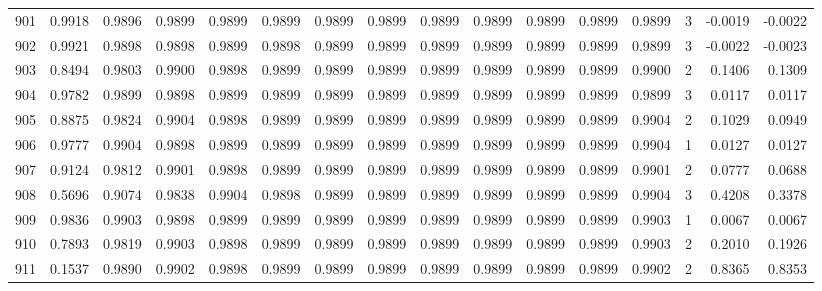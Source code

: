 \begin{tabular}{lrrrrrrrrrrrrrrr}
901 &      0.9918 &  0.9896 &  0.9899 &  0.9899 &  0.9899 &  0.9899 &  0.9899 &  0.9899 &  0.9899 &  0.9899 &   0.9899 &     0.9899 &      3 &                   -0.0019 &                    -0.0022 \\
902 &      0.9921 &  0.9898 &  0.9898 &  0.9899 &  0.9898 &  0.9899 &  0.9899 &  0.9899 &  0.9899 &  0.9899 &   0.9899 &     0.9899 &      3 &                   -0.0022 &                    -0.0023 \\
903 &      0.8494 &  0.9803 &  0.9900 &  0.9898 &  0.9899 &  0.9899 &  0.9899 &  0.9899 &  0.9899 &  0.9899 &   0.9899 &     0.9900 &      2 &                    0.1406 &                     0.1309 \\
904 &      0.9782 &  0.9899 &  0.9898 &  0.9899 &  0.9899 &  0.9899 &  0.9899 &  0.9899 &  0.9899 &  0.9899 &   0.9899 &     0.9899 &      3 &                    0.0117 &                     0.0117 \\
905 &      0.8875 &  0.9824 &  0.9904 &  0.9898 &  0.9899 &  0.9899 &  0.9899 &  0.9899 &  0.9899 &  0.9899 &   0.9899 &     0.9904 &      2 &                    0.1029 &                     0.0949 \\
906 &      0.9777 &  0.9904 &  0.9898 &  0.9899 &  0.9899 &  0.9899 &  0.9899 &  0.9899 &  0.9899 &  0.9899 &   0.9899 &     0.9904 &      1 &                    0.0127 &                     0.0127 \\
907 &      0.9124 &  0.9812 &  0.9901 &  0.9898 &  0.9899 &  0.9899 &  0.9899 &  0.9899 &  0.9899 &  0.9899 &   0.9899 &     0.9901 &      2 &                    0.0777 &                     0.0688 \\
908 &      0.5696 &  0.9074 &  0.9838 &  0.9904 &  0.9898 &  0.9899 &  0.9899 &  0.9899 &  0.9899 &  0.9899 &   0.9899 &     0.9904 &      3 &                    0.4208 &                     0.3378 \\
909 &      0.9836 &  0.9903 &  0.9898 &  0.9899 &  0.9899 &  0.9899 &  0.9899 &  0.9899 &  0.9899 &  0.9899 &   0.9899 &     0.9903 &      1 &                    0.0067 &                     0.0067 \\
910 &      0.7893 &  0.9819 &  0.9903 &  0.9898 &  0.9899 &  0.9899 &  0.9899 &  0.9899 &  0.9899 &  0.9899 &   0.9899 &     0.9903 &      2 &                    0.2010 &                     0.1926 \\
911 &      0.1537 &  0.9890 &  0.9902 &  0.9898 &  0.9899 &  0.9899 &  0.9899 &  0.9899 &  0.9899 &  0.9899 &   0.9899 &     0.9902 &      2 &                    0.8365 &                     0.8353 \\

\end{tabular}
